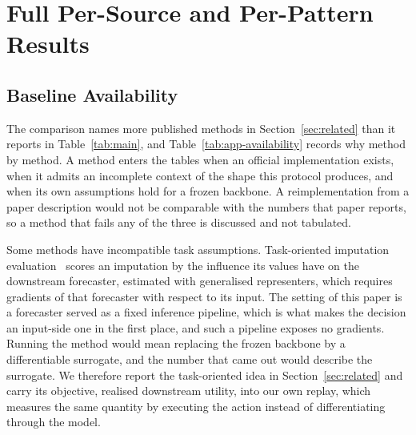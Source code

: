 \documentclass{article}
\begin{document}
\section{Full Per-Source and Per-Pattern Results}
\label{app:full-results}
\subsection{Baseline Availability}
\label{app:baseline-availability}
The comparison names more published methods in Section~\ref{sec:related} than it reports in
Table~\ref{tab:main}, and Table~\ref{tab:app-availability} records why method by method. A
method enters the tables when an official implementation exists, when it admits an incomplete
context of the shape this protocol produces, and when its own assumptions hold for a frozen
backbone. A reimplementation from a paper description would not be comparable with the numbers
that paper reports, so a method that fails any of the three is discussed and not tabulated.

Some methods have incompatible task assumptions. Task-oriented imputation
evaluation~\citep{wang2024taskoriented} scores an imputation by the influence its values have
on the downstream forecaster, estimated with generalised representers, which requires gradients
of that forecaster with respect to its input. The setting of this paper is a forecaster served
as a fixed inference pipeline, which is what makes the decision an input-side one in the first
place, and such a pipeline exposes no gradients. Running the method would mean replacing the
frozen backbone by a differentiable surrogate, and the number that came out would describe the
surrogate. We therefore report the task-oriented idea in Section~\ref{sec:related} and carry
its objective, realised downstream utility, into our own replay, which measures the same
quantity by executing the action instead of differentiating through the model.
\end{document}
